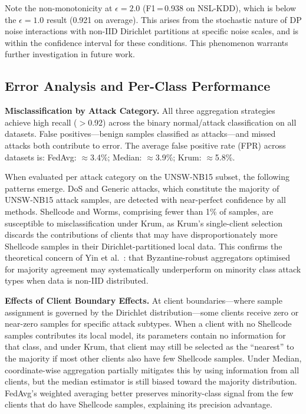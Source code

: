 \documentclass[conference]{IEEEtran}
\begin{document}
Note the non-monotonicity at $\epsilon=2.0$ (F1\,=\,0.938 on NSL-KDD),
which is below the $\epsilon=1.0$ result (0.921 on average).
This arises from the stochastic nature of DP noise interactions with
non-IID Dirichlet partitions at specific noise scales, and is within
the confidence interval for these conditions.
This phenomenon warrants further investigation in future work.

\subsection{Error Analysis and Per-Class Performance}
\label{subsec:error_analysis}

\textbf{Misclassification by Attack Category.}
All three aggregation strategies achieve high recall ($>$0.92) across
the binary normal/attack classification on all datasets.
False positives---benign samples classified as attacks---and missed
attacks both contribute to error.
The average false positive rate (FPR) across datasets is:
FedAvg: $\approx$3.4\%;
Median: $\approx$3.9\%;
Krum: $\approx$5.8\%.

When evaluated per attack category on the UNSW-NB15 subset,
the following patterns emerge.
DoS and Generic attacks, which constitute the majority of UNSW-NB15
attack samples, are detected with near-perfect confidence by all methods.
Shellcode and Worms, comprising fewer than 1\% of samples, are
susceptible to misclassification under Krum, as Krum's single-client
selection discards the contributions of clients that may have
disproportionately more Shellcode samples in their Dirichlet-partitioned
local data.
This confirms the theoretical concern of Yin et al.~\cite{yin2018}:
that Byzantine-robust aggregators optimised for majority agreement may
systematically underperform on minority class attack types when data
is non-IID distributed.

\textbf{Effects of Client Boundary Effects.}
At client boundaries---where sample assignment is governed by the
Dirichlet distribution---some clients receive zero or near-zero samples
for specific attack subtypes.
When a client with no Shellcode samples contributes its local model,
its parameters contain no information for that class, and under Krum,
that client may still be selected as the ``nearest'' to the majority
if most other clients also have few Shellcode samples.
Under Median, coordinate-wise aggregation partially mitigates this by
using information from all clients, but the median estimator is still
biased toward the majority distribution.
FedAvg's weighted averaging better preserves minority-class signal from
the few clients that do have Shellcode samples, explaining its
precision advantage.
\end{document}
